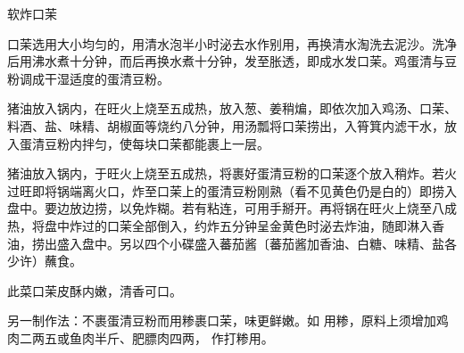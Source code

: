 \begin{recipe}{软炸口茉}

\ingredients



\cooking

\step 口茉选用大小均匀的，用清水泡半小时泌去水作别用，再换清水淘洗去泥沙。洗净后用沸水煮十分钟，而后再换水煮十分钟，发至胀透，即成水发口茉。鸡蛋清与豆粉调成干湿适度的蛋清豆粉。

\step 猪油放入锅内，在旺火上烧至五成热，放入葱、姜稍煸，即依次加入鸡汤、口茉、料酒、盐、味精、胡椒面等烧约八分钟，用汤瓢将口茉捞出，入筲箕内滤干水，放入蛋清豆粉内拌匀，使每块口茉都能裹上一层。

\step 猪油放入锅内，于旺火上烧至五成热，将裹好蛋清豆粉的口茉逐个放入稍炸。若火过旺即将锅端离火口，炸至口茉上的蛋清豆粉刚熟（看不见黄色仍是白的）即捞入盘中。要边放边捞，以免炸糊。若有粘连，可用手掰开。再将锅在旺火上烧至八成热，将盘中炸过的口茉全部倒入，约炸五分钟呈金黄色时泌去炸油，随即淋入香油，捞出盛入盘中。另以四个小碟盛入蕃茄酱〔蕃茄酱加香油、白糖、味精、盐各少许）蘸食。

\notes

此菜口茉皮酥内嫩，清香可口。

另一制作法：不裹蛋清豆粉而用糁裹口茉，味更鲜嫩。如 用糁，原料上须增加鸡肉二两五或鱼肉半斤、肥膘肉四两， 作打糁用。

\end{recipe}

